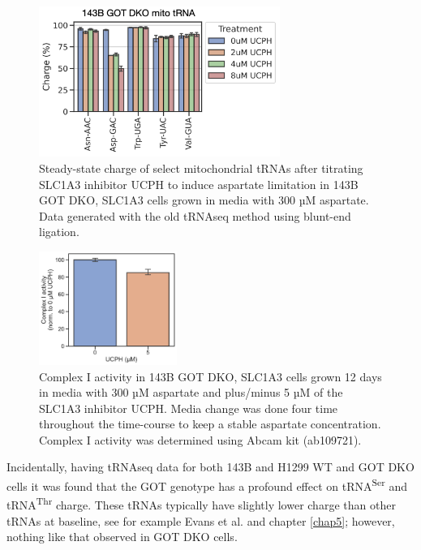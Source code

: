 \begin{figure}[ht]
    \centering
    \includegraphics[width=0.7\textwidth]{figures/sapp/DKO_char/143B_GOT-DKO_UCPH-tit_tRNA.png}
    \caption[143B GOT DKO Asp titration using UCPH, tRNA charge.]{
    Steady-state charge of select mitochondrial tRNAs after titrating SLC1A3 inhibitor UCPH to induce aspartate limitation in 143B GOT DKO, SLC1A3 cells grown in media with 300 µM aspartate.
    Data generated with the old tRNAseq method using blunt-end ligation.
    }
    \label{fig:sapp:DKO_char:143B_DKO_UCPH_tRNA}
\end{figure}

\begin{figure}[ht]
    \centering
    \includegraphics[width=0.4\textwidth]{figures/sapp/DKO_char/143B_GOT-DKO_CI-activity.pdf}
    \caption[143B GOT DKO Asp depletion effect on complex I.]{
    Complex I activity in 143B GOT DKO, SLC1A3 cells grown 12 days in media with 300 µM aspartate and plus/minus 5 µM of the SLC1A3 inhibitor UCPH.
    Media change was done four time throughout the time-course to keep a stable aspartate concentration.
    Complex I activity was determined using Abcam kit (ab109721).
    }
    \label{fig:sapp:DKO_char:143B_DKO_CI}
\end{figure}



\FloatBarrier
Incidentally, having tRNAseq data for both 143B and H1299 WT and GOT DKO cells it was found that the GOT genotype has a profound effect on tRNA\textsuperscript{Ser} and tRNA\textsuperscript{Thr} charge.
These tRNAs typically have slightly lower charge than other tRNAs at baseline, see for example Evans et al. \cite{Evans2017-st} and chapter \ref{chap5}; however, nothing like that observed in GOT DKO cells.


